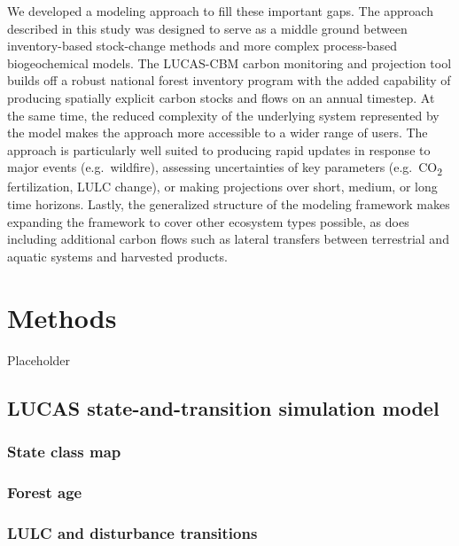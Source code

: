 \documentclass[
]{book}
\begin{document}
We developed a modeling approach to fill these important gaps. The approach described in this study was designed to serve as a middle ground between inventory-based stock-change methods and more complex process-based biogeochemical models. The LUCAS-CBM carbon monitoring and projection tool builds off a robust national forest inventory program with the added capability of producing spatially explicit carbon stocks and flows on an annual timestep. At the same time, the reduced complexity of the underlying system represented by the model makes the approach more accessible to a wider range of users. The approach is particularly well suited to producing rapid updates in response to major events (e.g.~wildfire), assessing uncertainties of key parameters (e.g.~CO\textsubscript{2} fertilization, LULC change), or making projections over short, medium, or long time horizons. Lastly, the generalized structure of the modeling framework makes expanding the framework to cover other ecosystem types possible, as does including additional carbon flows such as lateral transfers between terrestrial and aquatic systems and harvested products.

\hypertarget{methods}{%
\chapter{Methods}\label{methods}}

Placeholder

\hypertarget{lucas-state-and-transition-simulation-model}{%
\section{LUCAS state-and-transition simulation model}\label{lucas-state-and-transition-simulation-model}}

\hypertarget{state-class-map}{%
\subsection{State class map}\label{state-class-map}}

\hypertarget{forest-age}{%
\subsection{Forest age}\label{forest-age}}

\hypertarget{lulc-and-disturbance-transitions}{%
\subsection{LULC and disturbance transitions}\label{lulc-and-disturbance-transitions}}
\end{document}
